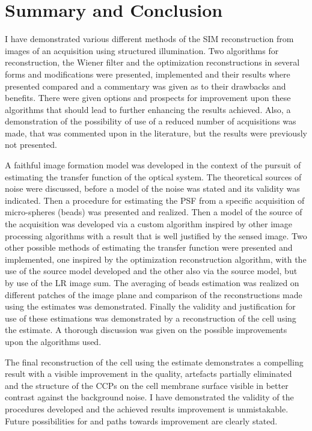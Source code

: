 \chapter*{Summary and Conclusion\,\,}

I have demonstrated various different methods of the \ac{SIM} reconstruction from images of an acquisition using
    structured illumination.
Two algorithms for reconstruction, the Wiener filter and the optimization reconstructions in several forms and
    modifications were presented, implemented and their results where presented compared and a commentary was given as 
    to their drawbacks and benefits.
There were given options and prospects for improvement upon these algorithms that should lead to further enhancing the
    results achieved.
Also, a demonstration of the possibility of use of a reduced number of acquisitions was made, that was commented upon in
    the literature, but the results were previously not presented.

A faithful image formation model was developed in the context of the pursuit of estimating the transfer function of the 
    optical system.
The theoretical sources of noise were discussed, before a model of the noise was stated and its validity was indicated.
Then a procedure for estimating the \ac{PSF} from a specific acquisition of micro-spheres (beads) was presented and
    realized.
Then a model of the source of the acquisition was developed via a custom algorithm inspired by other image processing
    algorithms with a result that is well justified by the sensed image.
Two other possible methods of estimating the transfer function were presented and implemented, one inspired by the 
    optimization reconstruction algorithm, with the use of the source model developed and the other also via the source 
    model, but by use of the \ac{LR} image sum.
The averaging of beads estimation was realized on different patches of the image plane and comparison of the
    reconstructions made using the estimates was demonstrated.
Finally the validity and justification for use of these estimations was demonstrated by a reconstruction of the cell
    using the estimate.
A thorough discussion was given on the possible improvements upon the algorithms used.

The final reconstruction of the cell using the estimate demonstrates a compelling result with a visible improvement in
    the quality, artefacts partially eliminated and the structure of the \acp{CCP} on the cell membrane surface
    visible in better contrast against the background noise.
I have demonstrated the validity of the procedures developed and the achieved results improvement is unmistakable.
Future possibilities for and paths towards improvement are clearly stated.
